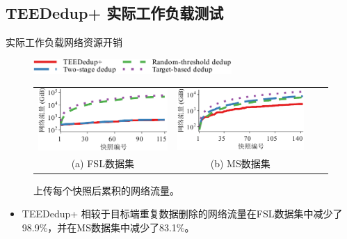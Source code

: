 \documentclass{beamer}
\newcommand{\prototype}{TEEDedup+ }
\begin{document}
\subsection{\prototype 实际工作负载测试}

\begin{frame}{实际工作负载网络资源开销}
    \begin{figure}[!htb]
        \centering
        \includegraphics[height=16pt]{../pic/featurespy/plot/bandwidth/upload_traffic_legend.pdf}
        \vspace{5pt} \\
        \begin{tabular}{@{\ }c@{\ }c@{\ }c@{\ }c}
            \includegraphics[width=0.45\linewidth]{../pic/featurespy/plot/bandwidth/upload_traffic_fsl.pdf}   &
            \includegraphics[width=0.45\linewidth]{../pic/featurespy/plot/bandwidth/upload_traffic_ms.pdf}                                    \\
            {\small (a) FSL数据集}                                                                         & {\small (b) MS数据集}      
        \end{tabular}
        \caption{上传每个快照后累积的网络流量。}
        \label{fig:featurespy-expNetworkTraffic}
    \end{figure}

    \begin{itemize}
        \item \prototype 相较于目标端重复数据删除的网络流量在FSL数据集中减少了98.9\%，并在MS数据集中减少了83.1\%。
    \end{itemize}
\end{frame}
\end{document}
